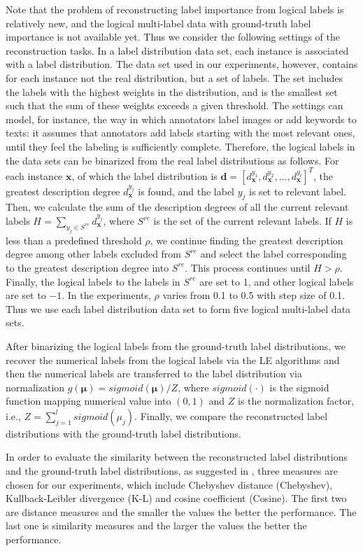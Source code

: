 \documentclass[conference]{IEEEtran}
\begin{document}
Note that the problem of reconstructing label importance from logical labels is relatively new, and the logical multi-label data with ground-truth label importance is not available yet. Thus we consider the following settings of the reconstruction tasks. In a label distribution data set, each instance is associated with a label distribution. The data set used in our experiments, however, contains for each instance not the real distribution, but a set of labels. The set includes the labels with the highest weights in the distribution, and is the smallest set such that the sum of these weights exceeds a given threshold. The settings can model, for instance, the way in which annotators label images or add keywords to texts: it assumes that annotators add labels starting with the most relevant ones, until they feel the labeling is sufficiently complete. Therefore, the logical labels in the data sets can be binarized from the real label distributions as follows. For each instance $\bm{x}$, of which the label distribution is $\bm{d}=[d_{\bm{x}}^{y_{1}},d_{\bm{x}}^{y_{2}},...,d_{\bm{x}}^{y_{l}}]^T$, the greatest description degree $d_{\bm{x}}^{y_{j}}$ is found, and the label $y_{j}$ is set to relevant label. Then, we calculate the sum of the description degrees of all the current relevant labels $H = \sum_{y_{j} \in S^{re}} d_{\bm{x}}^{y_{j}}$, where $S^{re}$ is the set of the current relevant labels. If $H$ is less than a predefined threshold $\rho$, we continue finding the greatest description degree among other labels excluded from $S^{re}$ and select the label corresponding to the greatest description degree into $S^{re}$. This process continues until $H > \rho$. Finally, the logical labels to the labels in $S^{re}$ are set to 1, and other logical labels are set to $-1$. In the experiments, $\rho$ varies from 0.1 to 0.5 with step size of 0.1. Thus we use each label distribution data set to form five logical multi-label data sets.

After binarizing the logical labels from the ground-truth label distributions, we recover the numerical labels from the logical labels via the LE algorithms and then the numerical labels are transferred
to the label distribution via normalization $g(\bm{\mu}) = sigmoid(\bm{\mu})/Z$, where $sigmoid(\bm{\cdot})$ is the sigmoid function mapping numerical value into $(0,1)$ and $Z$ is the normalization factor, i.e., $Z = \sum_{j=1}^lsigmoid(\mu_j)$. Finally, we compare the reconstructed label distributions with the ground-truth label distributions.

In order to evaluate the similarity between the reconstructed label distributions and the ground-truth label distributions, as suggested in \cite{geng2016label}, three measures are chosen for our experiments, which include Chebyshev distance (Chebyshev), Kullback-Leibler divergence (K-L) and cosine coefficient (Cosine). The first two are distance measures and the smaller the values the better the performance. The last one is similarity measures and the larger the values the better the performance.
\end{document}
